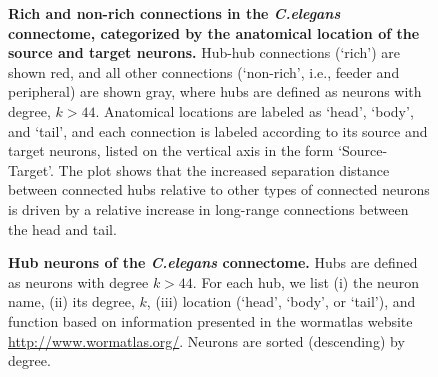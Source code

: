 \begin{figure}[h!]
 \caption{{\bf Rich and non-rich connections in the \emph{C.elegans} connectome, categorized by the  anatomical location of the source and target neurons.}
   Hub-hub connections (`rich') are shown red, and all other connections (`non-rich', i.e., feeder and peripheral) are shown gray, where hubs are defined as neurons with degree, $k > 44$.
Anatomical locations are labeled as `head', `body', and `tail', and each connection is labeled according to its source and target neurons, listed on the vertical axis in the form `Source-Target'.
The plot shows that the increased separation distance between connected hubs relative to other types of connected neurons is driven by a relative increase in long-range connections between the head and tail.}
\label{fig:Ch2S6_Fig}
\end{figure}

\begin{figure}[h!]
   \caption{{\bf Hub neurons of the \textit{C.elegans} connectome.} Hubs are defined as neurons with degree $k > 44$. For each hub, we list (i) the neuron name, (ii) its degree, $k$, (iii) location (`head', `body', or `tail'), and function based on information presented in the wormatlas website \url{http://www.wormatlas.org/}.
Neurons are sorted (descending) by degree.}
\label{tab:HubList}
\end{figure}


